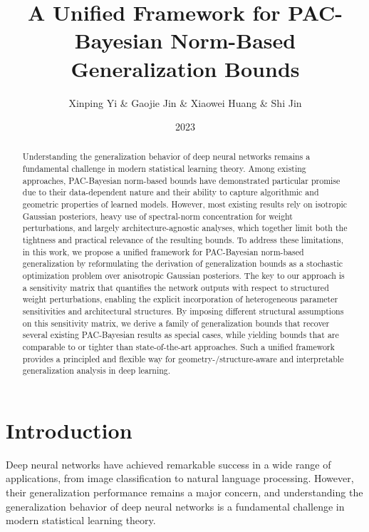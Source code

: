 \documentclass{article}
\begin{document}
\title{A Unified Framework for PAC-Bayesian Norm-Based Generalization Bounds}

\author{Xinping Yi \& Gaojie Jin \& Xiaowei Huang \& Shi Jin}

\date{2023}

\maketitle

\begin{abstract}
Understanding the generalization behavior of deep neural networks remains a fundamental challenge in modern statistical learning theory. Among existing approaches, PAC-Bayesian norm-based bounds have demonstrated particular promise due to their data-dependent nature and their ability to capture algorithmic and geometric properties of learned models. However, most existing results rely on isotropic Gaussian posteriors, heavy use of spectral-norm concentration for weight perturbations, and largely architecture-agnostic analyses, which together limit both the tightness and practical relevance of the resulting bounds. To address these limitations, in this work, we propose a unified framework for PAC-Bayesian norm-based generalization by reformulating the derivation of generalization bounds as a stochastic optimization problem over anisotropic Gaussian posteriors. The key to our approach is a sensitivity matrix that quantifies the network outputs with respect to structured weight perturbations, enabling the explicit incorporation of heterogeneous parameter sensitivities and architectural structures. By imposing different structural assumptions on this sensitivity matrix, we derive a family of generalization bounds that recover several existing PAC-Bayesian results as special cases, while yielding bounds that are comparable to or tighter than state-of-the-art approaches. Such a unified framework provides a principled and flexible way for geometry-/structure-aware and interpretable generalization analysis in deep learning.
\end{abstract}

\section{Introduction}

Deep neural networks have achieved remarkable success in a wide range of applications, from image classification to natural language processing. However, their generalization performance remains a major concern, and understanding the generalization behavior of deep neural networks is a fundamental challenge in modern statistical learning theory.
\end{document}
